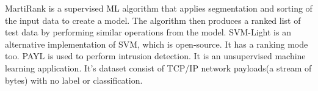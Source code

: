 MartiRank is a supervised ML algorithm that applies segmentation and sorting of the input data to create a model. The algorithm then produces a ranked list of test data by performing similar operations from the model.
SVM-Light is an alternative implementation of SVM, which is open-source. It has a ranking mode too.
PAYL  is used to perform intrusion detection. It is an unsupervised machine learning application. It's dataset consist of TCP/IP network payloads(a stream of bytes) with no label or classification.

